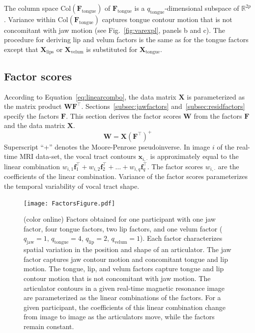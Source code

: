 \documentclass[preprint]{JASAnew}\usepackage[]{graphicx}\usepackage[]{color}
\begin{document}
The column space $\mathrm{Col}(\mathbf{F}_\text{tongue})$ of $\mathbf{F}_\text{tongue}$ is a $q_\text{tongue}$-dimensional subspace of $\mathbb{R}^{2p}$. 
%
Variance within $\mathrm{Col}(\mathbf{F}_\text{tongue})$ captures tongue contour motion that is not concomitant with jaw motion (see Fig.~\ref{fig:varexpl}, panels b and c). 
%
The procedure for deriving lip and velum factors is the same as for the tongue factors except that $\mathbf{X}_\text{lips}$ or $\mathbf{X}_\text{velum}$ is substituted for $\mathbf{X}_\text{tongue}$.




\subsection{Factor scores}
\label{subsec:weights}

According to Equation~\ref{eq:linearcombo}, the data matrix $\mathbf{X}$ is parameterized as the matrix product $\mathbf{W}\mathbf{F}^\intercal$. 
%
Sections~\ref{subsec:jawfactors} and~\ref{subsec:residfactors} specify the factors $\mathbf{F}$. 
%
This section derives the factor scores $\mathbf{W}$ from the factors $\mathbf{F}$ and the data matrix $\mathbf{X}$. 
%
\begin{equation}
\mathbf{W} 
 = \mathbf{X} \left( \mathbf{F}^\intercal \right) ^+
\end{equation}
%
Superscript ``+'' denotes the Moore-Penrose pseudoinverse.
%
In image $i$ of the real-time MRI data-set, the vocal tract contours $\mathbf{x}_{i,\cdot}$ is approximately equal to the linear combination $w_{i,1} \mathbf{f}_1^\intercal + w_{i,2} \mathbf{f}_2^\intercal + \ldots + w_{i,q} \mathbf{f}_q^\intercal$. The factor scores $w_{i,\cdot }$ are the coefficients of the linear combination. Variance of the factor scores parameterizes the temporal variability of vocal tract shape. 

\begin{figure}

\texttt{[image: FactorsFigure.pdf]}

\caption{(color online) Factors obtained for one participant with one jaw factor, four tongue factors, two lip factors, and one velum factor ($q_\text{jaw} = 1$, $q_\text{tongue} = 4$, $q_\text{lip} = 2$, $q_\text{velum} = 1$). 
Each factor characterizes spatial variation in the position and shape of an articulator. 
The jaw factor captures jaw contour motion and concomitant tongue and lip motion.
The tongue, lip, and velum factors capture tongue and lip contour motion that is not concomitant with jaw motion. 
The articulator contours in a given real-time magnetic resonance image are parameterized as the linear combinations of the factors. 
For a given participant, the coefficients of this linear combination change from image to image as the articulators move, while the factors remain constant.}
\label{fig:gfa}
\end{figure}
\end{document}
